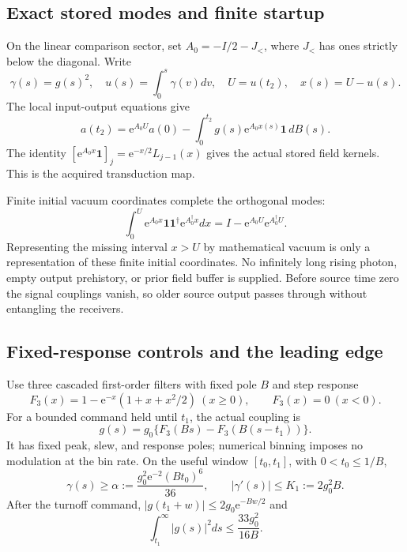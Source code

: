 \documentclass[11pt,a4paper]{article}
\newcommand{\ee}{\mathrm e}
\begin{document}
\subsection{Exact stored modes and finite startup}

On the linear comparison sector, set $A_0=-I/2-J_{<}$, where $J_{<}$ has ones strictly below the diagonal. Write
\begin{equation}
 \gamma(s)=g(s)^2,\quad u(s)=\int_0^s\gamma(v)dv,\quad
 U=u(t_2),\quad x(s)=U-u(s).
\end{equation}
The local input-output equations give
\begin{equation}
 a(t_2)=\ee^{A_0U}a(0)-\int_0^{t_2}g(s)\ee^{A_0x(s)}\mathbf1\,dB(s).
 \label{eq:capture}
\end{equation}
The identity $[\ee^{A_0x}\mathbf1]_j=\ee^{-x/2}L_{j-1}(x)$ gives the actual stored field kernels. This is the acquired transduction map.

Finite initial vacuum coordinates complete the orthogonal modes:
\begin{equation}
 \int_0^U\ee^{A_0x}\mathbf1\mathbf1^\dagger\ee^{A_0^\dagger x}dx
 =I-\ee^{A_0U}\ee^{A_0^\dagger U}.
 \label{eq:gramvac}
\end{equation}
Representing the missing interval $x>U$ by mathematical vacuum is only a representation of these finite initial coordinates. No infinitely long rising photon, empty output prehistory, or prior field buffer is supplied. Before source time zero the signal couplings vanish, so older source output passes through without entangling the receivers.

\subsection{Fixed-response controls and the leading edge}

Use three cascaded first-order filters with fixed pole $B$ and step response
\begin{equation}
 F_3(x)=1-\ee^{-x}(1+x+x^2/2)\ (x\ge0),\qquad F_3(x)=0\ (x<0).
\end{equation}
For a bounded command held until $t_1$, the actual coupling is
\begin{equation}
 g(s)=g_0\{F_3(Bs)-F_3(B(s-t_1))\}.
 \label{eq:actuator}
\end{equation}
It has fixed peak, slew, and response poles; numerical binning imposes no modulation at the bin rate. On the useful window $[t_0,t_1]$, with $0<t_0\le1/B$,
\begin{equation}
 \gamma(s)\ge\alpha:=\frac{g_0^2\ee^{-2}(Bt_0)^6}{36},\qquad
 |\gamma'(s)|\le K_1:=2g_0^2B.
 \label{eq:rise}
\end{equation}
After the turnoff command, $|g(t_1+w)|\le2g_0\ee^{-Bw/2}$ and
\begin{equation}
 \int_{t_1}^{\infty}|g(s)|^2ds\le\frac{33g_0^2}{16B}.
 \label{eq:tailarea}
\end{equation}
\end{document}
